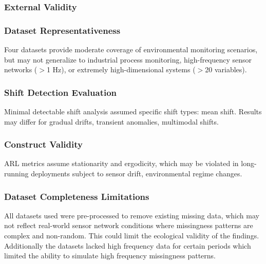 \subsubsection{External Validity}

\subsubsection{Dataset Representativeness}

Four datasets provide moderate coverage of environmental monitoring scenarios, but may not generalize to industrial process monitoring, high-frequency sensor networks ($>$1 Hz), or extremely high-dimensional systems ($>$20 variables).

\subsubsection{Shift Detection Evaluation}

Minimal detectable shift analysis assumed specific shift types: mean shift. Results may differ for gradual drifts, transient anomalies, multimodal shifts.

\subsubsection{Construct Validity}

\ac{ARL} metrics assume stationarity and ergodicity, which may be violated in long-running deployments subject to sensor drift, environmental regime changes.

\subsubsection{Dataset Completeness Limitations}

All datasets used were pre-processed to remove existing missing data, which may not reflect real-world sensor network conditions where missingness patterns are complex and non-random. This could limit the ecological validity of the findings.
Additionally the datasets lacked high frequency data for certain periods which limited the ability to simulate high frequency missingness patterns. 

